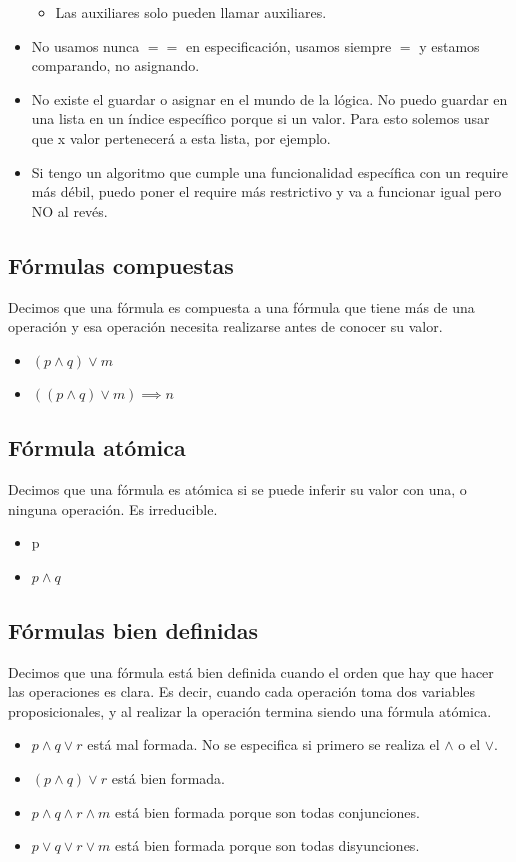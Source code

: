\documentclass[10pt,a4paper]{article}
\begin{document}
\begin{itemize}
\begin{itemize}
        \item Las auxiliares solo pueden llamar auxiliares.
    \end{itemize}
    \item No usamos nunca \(==\) en especificación, usamos siempre \(=\) y estamos comparando, no asignando.
    \item No existe el guardar o asignar en el mundo de la lógica. No puedo guardar en una lista en un índice específico porque si un valor. Para esto solemos usar que x valor pertenecerá a esta lista, por ejemplo.
    \item Si tengo un algoritmo que cumple una funcionalidad específica con un require más débil, puedo poner el require más restrictivo y va a funcionar igual pero NO al revés.
\end{itemize}
\subsection*{Fórmulas compuestas}
Decimos que una fórmula es compuesta a una fórmula que tiene más de una operación y esa operación necesita realizarse antes de conocer su valor.
\begin{itemize}
    \item \((p \land q) \lor m\)
    \item \(((p \land q) \lor m) \implies n\)
\end{itemize}
\subsection*{Fórmula atómica}
Decimos que una fórmula es atómica si se puede inferir su valor con una, o ninguna operación. Es irreducible.
\begin{itemize}
    \item p
    \item \(p \land q\)
\end{itemize}
\subsection*{Fórmulas bien definidas}
Decimos que una fórmula está bien definida cuando el orden que hay que hacer las operaciones es clara. Es decir, cuando cada operación toma dos variables proposicionales, y al realizar la operación termina siendo una fórmula atómica.
\begin{itemize}
    \item \(p \land q \lor r\) está mal formada. No se especifica si primero se realiza el \(\land\) o el \(\lor\).
    \item \((p \land q) \lor r\) está bien formada.
    \item \(p \land q \land r \land m\) está bien formada porque son todas conjunciones.
    \item \(p \lor q \lor r \lor m\) está bien formada porque son todas disyunciones.
\end{itemize}
\end{document}
